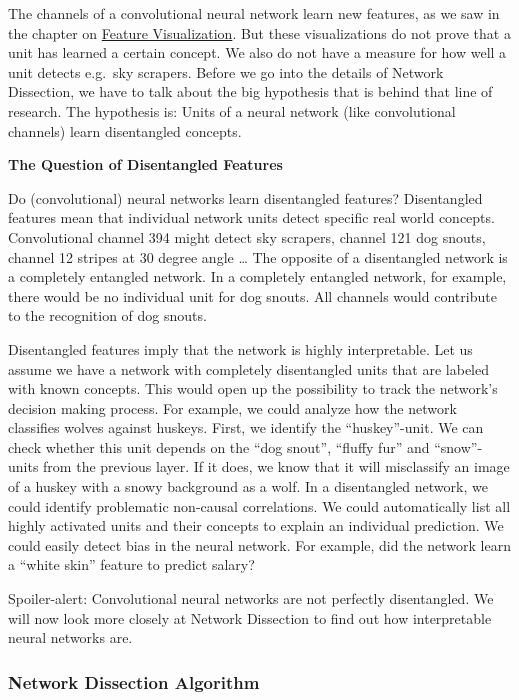 \documentclass[12pt,]{krantz}
\begin{document}
The channels of a convolutional neural network learn new features, as we
saw in the chapter on \protect\hyperlink{feature-visualization}{Feature
Visualization}. But these visualizations do not prove that a unit has
learned a certain concept. We also do not have a measure for how well a
unit detects e.g.~sky scrapers. Before we go into the details of Network
Dissection, we have to talk about the big hypothesis that is behind that
line of research. The hypothesis is: Units of a neural network (like
convolutional channels) learn disentangled concepts.

\textbf{The Question of Disentangled Features}

Do (convolutional) neural networks learn disentangled features?
Disentangled features mean that individual network units detect specific
real world concepts. Convolutional channel 394 might detect sky
scrapers, channel 121 dog snouts, channel 12 stripes at 30 degree angle
\ldots{} The opposite of a disentangled network is a completely
entangled network. In a completely entangled network, for example, there
would be no individual unit for dog snouts. All channels would
contribute to the recognition of dog snouts.

Disentangled features imply that the network is highly interpretable.
Let us assume we have a network with completely disentangled units that
are labeled with known concepts. This would open up the possibility to
track the network's decision making process. For example, we could
analyze how the network classifies wolves against huskeys. First, we
identify the ``huskey''-unit. We can check whether this unit depends on
the ``dog snout'', ``fluffy fur'' and ``snow''-units from the previous
layer. If it does, we know that it will misclassify an image of a huskey
with a snowy background as a wolf. In a disentangled network, we could
identify problematic non-causal correlations. We could automatically
list all highly activated units and their concepts to explain an
individual prediction. We could easily detect bias in the neural
network. For example, did the network learn a ``white skin'' feature to
predict salary?

Spoiler-alert: Convolutional neural networks are not perfectly
disentangled. We will now look more closely at Network Dissection to
find out how interpretable neural networks are.

\subsubsection{Network Dissection
Algorithm}\label{network-dissection-algorithm}
\end{document}
